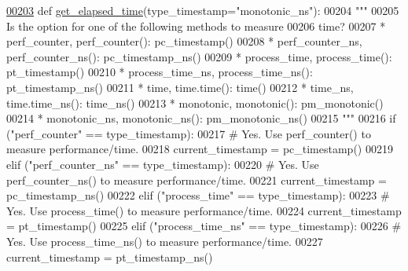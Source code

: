 \begin{DoxyCode}
\hypertarget{classutilities_1_1timing__measurements_1_1performance__measurement_1_1execution__time__measurement_l00203}{}\hyperlink{classutilities_1_1timing__measurements_1_1performance__measurement_1_1execution__time__measurement_a02b1d7ffce2b4c702a82a03803322e65}{00203}     \textcolor{keyword}{def }\hyperlink{classutilities_1_1timing__measurements_1_1performance__measurement_1_1execution__time__measurement_a02b1d7ffce2b4c702a82a03803322e65}{get\_elapsed\_time}(type\_timestamp="monotonic\_ns"):
00204         \textcolor{stringliteral}{"""}
00205 \textcolor{stringliteral}{            Is the option for one of the following methods to measure}
00206 \textcolor{stringliteral}{                time?}
00207 \textcolor{stringliteral}{                * perf\_counter, perf\_counter(): pc\_timestamp()}
00208 \textcolor{stringliteral}{                * perf\_counter\_ns, perf\_counter\_ns(): pc\_timestamp\_ns()}
00209 \textcolor{stringliteral}{                * process\_time, process\_time(): pt\_timestamp()}
00210 \textcolor{stringliteral}{                * process\_time\_ns, process\_time\_ns(): pt\_timestamp\_ns()}
00211 \textcolor{stringliteral}{                * time, time.time(): time()}
00212 \textcolor{stringliteral}{                * time\_ns, time.time\_ns(): time\_ns()}
00213 \textcolor{stringliteral}{                * monotonic, monotonic(): pm\_monotonic()}
00214 \textcolor{stringliteral}{                * monotonic\_ns, monotonic\_ns(): pm\_monotonic\_ns()}
00215 \textcolor{stringliteral}{        """}
00216         \textcolor{keywordflow}{if} (\textcolor{stringliteral}{"perf\_counter"} == type\_timestamp):
00217             \textcolor{comment}{# Yes. Use perf\_counter() to measure performance/time.}
00218             current\_timestamp = pc\_timestamp()
00219         \textcolor{keywordflow}{elif} (\textcolor{stringliteral}{"perf\_counter\_ns"} == type\_timestamp):
00220             \textcolor{comment}{# Yes. Use perf\_counter\_ns() to measure performance/time.}
00221             current\_timestamp = pc\_timestamp\_ns()
00222         \textcolor{keywordflow}{elif} (\textcolor{stringliteral}{"process\_time"} == type\_timestamp):
00223             \textcolor{comment}{# Yes. Use process\_time() to measure performance/time.}
00224             current\_timestamp = pt\_timestamp()
00225         \textcolor{keywordflow}{elif} (\textcolor{stringliteral}{"process\_time\_ns"} == type\_timestamp):
00226             \textcolor{comment}{# Yes. Use process\_time\_ns() to measure performance/time.}
00227             current\_timestamp = pt\_timestamp\_ns()

\end{DoxyCode}
